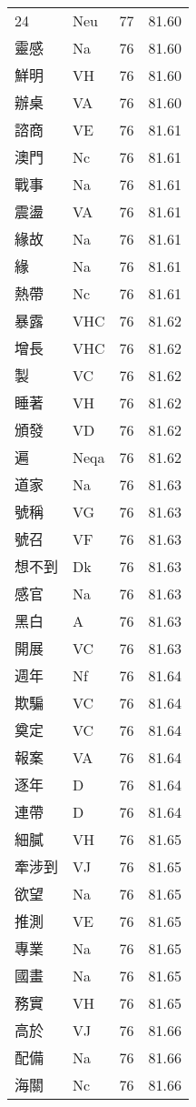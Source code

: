 \documentclass[twocolumn]{book}
\begin{document}
\begin{supertabular}{llrr}
24 & Neu & 77 &  81.60\\
靈感 & Na & 76 &  81.60\\
鮮明 & VH & 76 &  81.60\\
辦桌 & VA & 76 &  81.60\\
諮商 & VE & 76 &  81.61\\
澳門 & Nc & 76 &  81.61\\
戰事 & Na & 76 &  81.61\\
震盪 & VA & 76 &  81.61\\
緣故 & Na & 76 &  81.61\\
緣 & Na & 76 &  81.61\\
熱帶 & Nc & 76 &  81.61\\
暴露 & VHC & 76 &  81.62\\
增長 & VHC & 76 &  81.62\\
製 & VC & 76 &  81.62\\
睡著 & VH & 76 &  81.62\\
頒發 & VD & 76 &  81.62\\
遍 & Neqa & 76 &  81.62\\
道家 & Na & 76 &  81.63\\
號稱 & VG & 76 &  81.63\\
號召 & VF & 76 &  81.63\\
想不到 & Dk & 76 &  81.63\\
感官 & Na & 76 &  81.63\\
黑白 & A & 76 &  81.63\\
開展 & VC & 76 &  81.63\\
週年 & Nf & 76 &  81.64\\
欺騙 & VC & 76 &  81.64\\
奠定 & VC & 76 &  81.64\\
報案 & VA & 76 &  81.64\\
逐年 & D & 76 &  81.64\\
連帶 & D & 76 &  81.64\\
細膩 & VH & 76 &  81.65\\
牽涉到 & VJ & 76 &  81.65\\
欲望 & Na & 76 &  81.65\\
推測 & VE & 76 &  81.65\\
專業 & Na & 76 &  81.65\\
國畫 & Na & 76 &  81.65\\
務實 & VH & 76 &  81.65\\
高於 & VJ & 76 &  81.66\\
配備 & Na & 76 &  81.66\\
海關 & Nc & 76 &  81.66\\

\end{supertabular}
\end{document}

